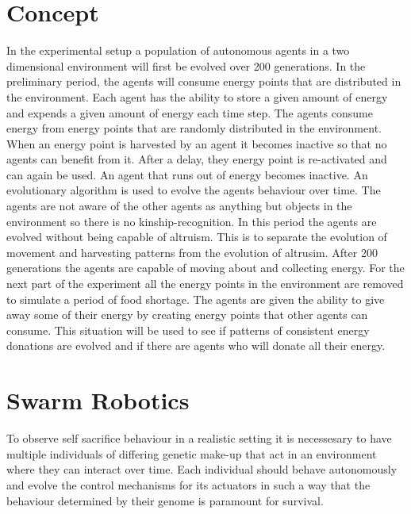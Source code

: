 \documentclass[a4paper]{book}
\begin{document}
\section{Concept}


In the experimental setup a population of autonomous agents in a two dimensional environment will first be evolved over 200 generations. In the preliminary period, the agents will consume energy points that are distributed in the environment. Each agent has the ability to store a given amount of energy and expends a given amount of energy each time step. The agents consume energy from energy points that are randomly distributed in the environment. When an energy point is harvested by an agent it becomes inactive so that no agents can benefit from it. After a delay, they energy point is re-activated and can again be used. An agent that runs out of energy becomes inactive. An evolutionary algorithm is used to evolve the agents behaviour over time. The agents are not aware of the other agents as anything but objects in the environment so there is no kinship-recognition. In this period the agents are evolved without being capable of altruism. This is to separate the evolution of movement and harvesting patterns from the evolution of altrusim. After 200 generations the agents are capable of moving about and collecting energy.
For the next part of the experiment all the energy points in the environment are removed to simulate a period of food shortage. The agents are given the ability to give away some of their energy by creating energy points that other agents can consume. This situation will be used to see if patterns of consistent energy donations are evolved and if there are agents who will donate all their energy.



\section{Swarm Robotics}
\label{sec:swarm}
To observe self sacrifice behaviour in a realistic setting it is necessesary to have multiple individuals of differing genetic make-up that act in an environment where they can interact over time. 
Each individual should behave autonomously and evolve the control mechanisms for its actuators in such a way that the behaviour determined by their genome is paramount for survival.
\end{document}
